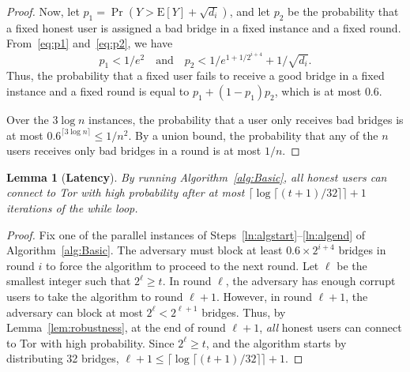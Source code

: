 \documentclass[letterpaper,twocolumn,10pt]{article}
\newcommand{\E}{\mathbf{\mathrm{E}}}
\newtheorem{lemma}{Lemma}
\newcommand{\sfsize}{\fontsize{0.73\baselineskip}{0.73\baselineskip}\selectfont}
\newcommand{\sans}[1]{\textsf{\sfsize \mbox{#1}}}
\newcommand{\sansb}[1]{\textbf{\sans{\mbox{#1}}}}
\begin{document}
\begin{proof}
	Now, let ${p_1 = \Pr(Y > \E[Y] + \sqrt{d_i})}$, and let $p_2$ be the probability that a fixed honest user is assigned a bad bridge in a fixed instance and a fixed round. From~\eqref{eq:p1} and~\eqref{eq:p2}, we have
	\[p_1 < 1/e^2 \quad \text{and} \quad p_2 < 1/e^{1+1/2^{i+4}} + 1/\sqrt{d_i}.\]
	Thus, the probability that a fixed user fails to receive a good bridge in a fixed instance and a fixed round is equal to ${p_1 + (1-p_1)p_2}$, which is at most $0.6$.
	
	Over the $3 \log{n}$ instances, the probability that a user only receives bad bridges is at most ${0.6^{\lceil 3\log{n} \rceil} \leq 1/n^2}$.
	By a union bound, the probability that any of the $n$ users receives only bad bridges in a round is at most $1/n$. 
\end{proof}



\begin{lemma}[\sansb{Latency}] \label{lem:NumIterationsBasic}
	By running Algorithm~\ref{alg:Basic}, all honest users can connect to Tor with high probability after at most ${\lceil \log{\lceil (t+1)/32 \rceil} \rceil + 1}$ iterations of the while loop.
\end{lemma}
\begin{proof}
	
	Fix one of the parallel instances of Steps~\ref{ln:algstart}--\ref{ln:algend} of Algorithm~\ref{alg:Basic}.  The adversary must block at least ${0.6 \times 2^{i+4}}$ bridges in round $i$ to force the algorithm to proceed to the next round. Let $\ell$ be the smallest integer such that ${2^\ell \geq t}$. In round $\ell$, the adversary has enough corrupt users to take the algorithm to round ${\ell + 1}$. However, in round ${{\ell + 1}}$, the adversary can block at most ${2^\ell < 2^{\ell+1}}$ bridges.  Thus, by Lemma~\ref{lem:robustness}, at the end of round  $\ell+1$,  \emph{all} honest users can connect to Tor with high probability. Since ${2^\ell \geq t}$, and the algorithm starts by distributing 32 bridges, 
	$\ell+1 \leq \lceil \log{\lceil (t+1)/32 \rceil} \rceil + 1.$\end{proof}
\end{document}

